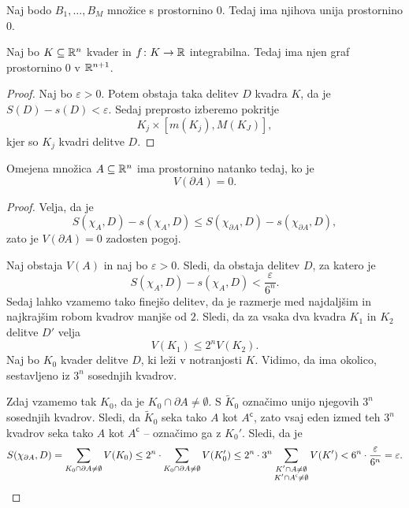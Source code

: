 \begin{trditev}
Naj bodo $B_1,\dots,B_M$ množice s prostornino $0$. Tedaj ima
njihova unija prostornino $0$.
\end{trditev}

\obvs

\begin{trditev}
Naj bo $K \subseteq \mathbb{R}^n$ kvader in $f \colon K \to \mathbb{R}$
integrabilna. Tedaj ima njen graf prostornino $0$ v $\mathbb{R}^{n+1}$.
\end{trditev}

\begin{proof}
Naj bo $\varepsilon > 0$. Potem obstaja taka delitev $D$ kvadra
$K$, da je $S(D) - s(D) < \varepsilon$. Sedaj preprosto izberemo
pokritje
\[
K_j \times [m(K_j), M(K_J)],
\]
kjer so $K_j$ kvadri delitve $D$.
\end{proof}


\begin{trditev}\label{td:3}
Omejena množica $A \subseteq \mathbb{R}^n$ ima prostornino natanko tedaj,
ko je
\[
V(\partial A) = 0.
\]
\end{trditev}

\begin{proof}
Velja, da je
\[
S(\chi_A,D) - s(\chi_A,D) \leq
S(\chi_{\partial A},D) - s(\chi_{\partial A},D),
\]
zato je $V(\partial A) = 0$ zadosten pogoj.

Naj obstaja $V(A)$ in naj bo $\varepsilon > 0$. Sledi, da obstaja
delitev $D$, za katero je
\[
S(\chi_A,D) - s(\chi_A,D) < \frac{\varepsilon}{6^n}.
\]
Sedaj lahko vzamemo tako finejšo delitev, da je razmerje med
najdaljšim in najkrajšim robom kvadrov manjše od $2$. Sledi, da za
vsaka dva kvadra $K_1$ in $K_2$ delitve $D'$ velja
\[
V(K_1) \leq 2^n V(K_2).
\]
Naj bo $K_0$ kvader delitve $D$, ki leži v notranjosti $K$. Vidimo,
da ima okolico, sestavljeno iz $3^n$ sosednjih kvadrov.

Zdaj vzamemo tak $K_0$, da je $K_0 \cap \partial A \ne \emptyset$.
S $\widetilde{K}_0$ označimo unijo njegovih $3^n$ sosednjih
kvadrov. Sledi, da $\widetilde{K}_0$ seka tako $A$ kot
$A^\mathsf{c}$, zato vsaj eden izmed teh $3^n$ kvadrov seka tako
$A$ kot $A^\mathsf{c}$ -- označimo ga z $K_0'$. Sledi, da je
\[
S(\chi_{\partial A},D) =
\sum_{K_0 \cap \partial A \ne \emptyset} V(K_0) \leq
2^n \cdot \sum_{K_0 \cap \partial A \ne \emptyset} V(K_0') \leq
2^n \cdot 3^n \sum_{\substack{
	K' \cap A \ne \emptyset \\
	K' \cap A^\mathsf{c} \ne \emptyset}
} V(K') <
6^n \cdot \frac{\varepsilon}{6^n} = \varepsilon. \qedhere
\]
\end{proof}

